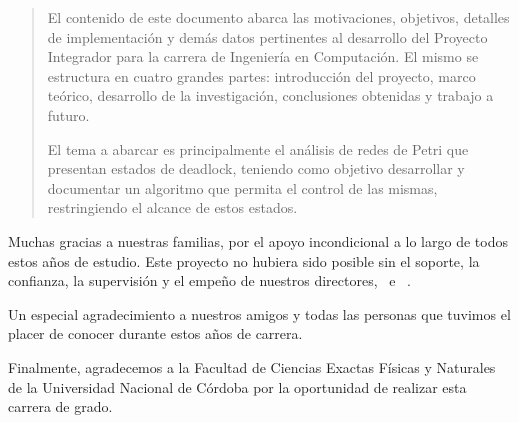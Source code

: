 \documentclass[
11pt, %
spanish, %
singlespacing, %
headsepline, %
]{MastersDoctoralThesis} %
\begin{document}
\begin{abstract}
    El contenido de este documento abarca las motivaciones, objetivos, detalles de implementación y demás datos pertinentes al desarrollo del Proyecto Integrador para la carrera de Ingeniería en Computación. El mismo se estructura en cuatro grandes partes: introducción del proyecto, marco teórico, desarrollo de la investigación, conclusiones obtenidas y trabajo a futuro.
    
    \par \noindent El tema a abarcar es principalmente el análisis de redes de Petri que presentan estados de deadlock, teniendo como objetivo desarrollar y documentar un algoritmo que permita el control de las mismas, restringiendo el alcance de estos estados.

\end{abstract}


 
\begin{acknowledgements}
	
	\addchaptertocentry{\acknowledgementname} %

	Muchas gracias a nuestras familias, por el apoyo incondicional a lo largo de todos estos años de estudio. Este proyecto no hubiera sido posible sin el soporte, la confianza, la supervisión y el empeño de nuestros directores, \supname \ e \ \examname .
	\bigskip
			
	Un especial agradecimiento a nuestros amigos y todas las personas que tuvimos el placer de conocer durante estos años de carrera. 
	\bigskip
			
    Finalmente, agradecemos a la Facultad de Ciencias Exactas Físicas y Naturales de la Universidad Nacional de Córdoba por la oportunidad de realizar esta carrera de grado.
    
	\vspace*{\fill}
		
\end{acknowledgements}
\end{document}
